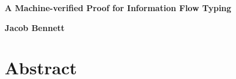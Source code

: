 \documentclass[12pt]{report}
\begin{document}

\newcommand{\insertnote}[3]{\noindent\textcolor{#1}{\textbf{#2:} #3}}
\newcommand{\joe}[1]{\insertnote{red}{JDT}{#1}}
\newcommand{\jacob}[1]{\insertnote{blue}{JB}{#1}}


\titleformat{\chapter}[display]
  {\normalfont\bfseries}{}{0pt}{\Huge}

\begin{titlepage}
\begin{center}

\begin{spacing}{1.5}
    \vspace*{\fill}
\end{spacing}

\begin{spacing}{2.5}
    \textbf{\Large A Machine-verified Proof for Information Flow Typing}\\[0.5cm]
    \vspace*{\fill}
\end{spacing}

\begin{spacing}{1.15}
    \textbf{\large Jacob Bennett}
    \date{}
\end{spacing}

\end{center}
\end{titlepage}

\setcounter{secnumdepth}{2}
\setcounter{tocdepth}{3}
\tableofcontents

\begin{coqdoccode}
\coqdocemptyline
\end{coqdoccode}

\section{Abstract}
\end{document}
